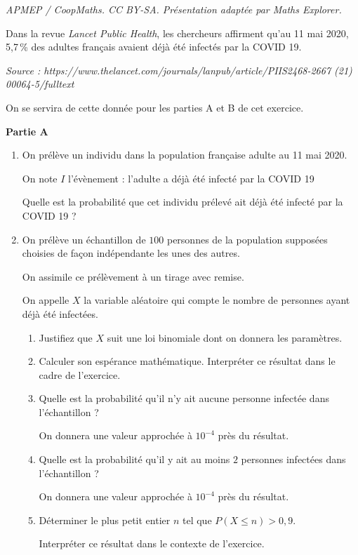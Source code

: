 \documentclass[10pt]{article}
\begin{document}
\noindent\textit{APMEP / CoopMaths. CC BY-SA. Présentation adaptée par Maths Explorer.}\par\medskip
\medskip

Dans la revue \emph{Lancet Public Health}, les chercheurs affirment qu'au 11 mai 2020, 5,7\,\% des adultes français avaient déjà été infectés par la COVID 19.

{\small \emph{Source : https://www.thelancet.com/journals/lanpub/article/PIIS2468-2667 (21) 00064-5/fulltext}}

On se servira de cette donnée pour les parties A et B de cet exercice.

\medskip

\textbf{Partie A}

\medskip

\begin{enumerate}
\item On prélève un individu dans la population française adulte au 11 mai 2020.

On note $I$ l'évènement : \og l'adulte a déjà été infecté par la COVID 19 \fg

Quelle est la probabilité que cet individu prélevé ait déjà été infecté par la COVID 19 ?
\item On prélève un échantillon de $100$ personnes de la population supposées choisies de façon indépendante les unes des autres.

On assimile ce prélèvement à un tirage avec remise.

On appelle $X$ la variable aléatoire qui compte le nombre de personnes ayant déjà été infectées.
	\begin{enumerate}
		\item Justifiez que $X$ suit une loi binomiale dont on donnera les paramètres.
		\item Calculer son espérance mathématique. Interpréter ce résultat dans le cadre de
l'exercice.
		\item Quelle est la probabilité qu'il n'y ait aucune personne infectée dans l'échantillon ?

On donnera une valeur approchée à $10^{-4}$ près du résultat.
		\item Quelle est la probabilité qu'il y ait au moins $2$ personnes infectées dans l'échantillon ?

On donnera une valeur approchée à $10^{-4}$ près du résultat.
		\item Déterminer le plus petit entier $n$ tel que $P(X \leqslant n) > 0,9$.

Interpréter ce résultat dans le contexte de l'exercice.
	\end{enumerate}
\end{enumerate}
\end{document}
